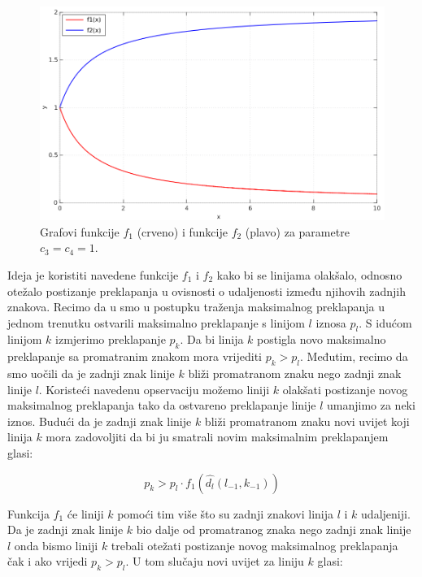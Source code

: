 \documentclass[times, utf8, zavrsni]{fer}
\begin{document}
\begin{figure}[htb]
    \centering
    \captionsetup{justification=centering,margin=2cm}
    \includegraphics[width=\textwidth]{images/function-01.png}
    \caption{
        Grafovi funkcije $f_1$ (crveno) i funkcije $f_2$ (plavo) za parametre
        $c_3 = c_4 = 1$.
    }
    \label{fig:function-01}
\end{figure}

\pagebreak

Ideja je koristiti navedene funkcije $f_1$ i $f_2$ kako bi se linijama
olakšalo, odnosno otežalo postizanje preklapanja u ovisnosti o udaljenosti
između njihovih zadnjih znakova. Recimo da u smo u postupku traženja maksimalnog
preklapanja u jednom trenutku ostvarili maksimalno preklapanje s linijom $l$
iznosa $p_l$. S idućom linijom $k$ izmjerimo preklapanje $p_k$. Da bi linija
$k$ postigla novo maksimalno preklapanje sa promatranim znakom mora vrijediti
$p_k > p_l$. Međutim, recimo da smo uočili da je zadnji znak linije $k$
bliži promatranom znaku nego zadnji znak linije $l$. Koristeći navedenu
opservaciju možemo liniji $k$ olakšati postizanje novog maksimalnog
preklapanja tako da ostvareno preklapanje linije $l$ umanjimo za neki iznos.
Budući da je zadnji znak linije $k$ bliži promatranom znaku novi uvijet koji
linija $k$ mora zadovoljiti da bi ju smatrali novim maksimalnim preklapanjem
glasi:

\begin{equation}
p_k > p_l \cdot f_1(\hat{d_l}(l_{-1},k_{-1}))
\end{equation}

Funkcija $f_1$ će liniji $k$ pomoći tim više što su zadnji znakovi linija
$l$ i $k$ udaljeniji. Da je zadnji znak linije $k$ bio dalje od
promatranog znaka nego zadnji znak linije $l$ onda bismo liniji $k$ trebali
otežati postizanje novog maksimalnog preklapanja čak i ako vrijedi $p_k > p_l$.
U tom slučaju novi uvijet za liniju $k$ glasi:
\end{document}
